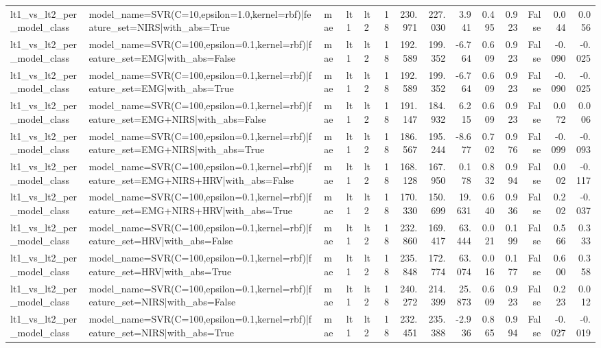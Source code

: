 \begin{table}
\begin{tabular}{lllllrrrrrrrrr}
lt1_vs_lt2_per_model_class & model_name=SVR(C=10,epsilon=1.0,kernel=rbf)|feature_set=NIRS|with_abs=True & mae & lt1 & lt2 & 18 & 230.971 & 227.030 & 3.941 & 0.495 & 0.923 & False & 0.044 & 0.056 \\
lt1_vs_lt2_per_model_class & model_name=SVR(C=100,epsilon=0.1,kernel=rbf)|feature_set=EMG|with_abs=False & mae & lt1 & lt2 & 18 & 192.589 & 199.352 & -6.764 & 0.609 & 0.923 & False & -0.090 & -0.025 \\
lt1_vs_lt2_per_model_class & model_name=SVR(C=100,epsilon=0.1,kernel=rbf)|feature_set=EMG|with_abs=True & mae & lt1 & lt2 & 18 & 192.589 & 199.352 & -6.764 & 0.609 & 0.923 & False & -0.090 & -0.025 \\
lt1_vs_lt2_per_model_class & model_name=SVR(C=100,epsilon=0.1,kernel=rbf)|feature_set=EMG+NIRS|with_abs=False & mae & lt1 & lt2 & 18 & 191.147 & 184.932 & 6.215 & 0.609 & 0.923 & False & 0.072 & 0.006 \\
lt1_vs_lt2_per_model_class & model_name=SVR(C=100,epsilon=0.1,kernel=rbf)|feature_set=EMG+NIRS|with_abs=True & mae & lt1 & lt2 & 18 & 186.567 & 195.244 & -8.677 & 0.702 & 0.976 & False & -0.099 & -0.093 \\
lt1_vs_lt2_per_model_class & model_name=SVR(C=100,epsilon=0.1,kernel=rbf)|feature_set=EMG+NIRS+HRV|with_abs=False & mae & lt1 & lt2 & 18 & 168.128 & 167.950 & 0.178 & 0.832 & 0.994 & False & 0.002 & -0.117 \\
lt1_vs_lt2_per_model_class & model_name=SVR(C=100,epsilon=0.1,kernel=rbf)|feature_set=EMG+NIRS+HRV|with_abs=True & mae & lt1 & lt2 & 18 & 170.330 & 150.699 & 19.631 & 0.640 & 0.936 & False & 0.202 & -0.037 \\
lt1_vs_lt2_per_model_class & model_name=SVR(C=100,epsilon=0.1,kernel=rbf)|feature_set=HRV|with_abs=False & mae & lt1 & lt2 & 18 & 232.860 & 169.417 & 63.444 & 0.021 & 0.199 & False & 0.566 & 0.333 \\
lt1_vs_lt2_per_model_class & model_name=SVR(C=100,epsilon=0.1,kernel=rbf)|feature_set=HRV|with_abs=True & mae & lt1 & lt2 & 18 & 235.848 & 172.774 & 63.074 & 0.016 & 0.177 & False & 0.600 & 0.358 \\
lt1_vs_lt2_per_model_class & model_name=SVR(C=100,epsilon=0.1,kernel=rbf)|feature_set=NIRS|with_abs=False & mae & lt1 & lt2 & 18 & 240.272 & 214.399 & 25.873 & 0.609 & 0.923 & False & 0.223 & 0.012 \\
lt1_vs_lt2_per_model_class & model_name=SVR(C=100,epsilon=0.1,kernel=rbf)|feature_set=NIRS|with_abs=True & mae & lt1 & lt2 & 18 & 232.451 & 235.388 & -2.936 & 0.865 & 0.994 & False & -0.027 & -0.019 \\

\end{tabular}
\end{table}
